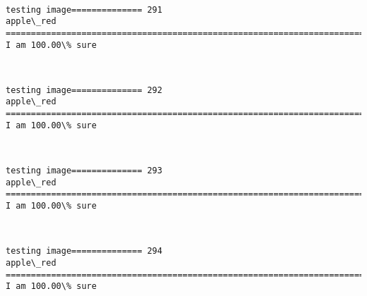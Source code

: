 \documentclass[11pt]{article}
\begin{document}
    \begin{center}
    \end{center}
    { \hspace*{\fill} \\}
    
    \begin{Verbatim}[commandchars=\\\{\}]
testing image============== 291
apple\_red
============================================================================
I am 100.00\% sure

    \end{Verbatim}

    \begin{center}
    \end{center}
    { \hspace*{\fill} \\}
    
    \begin{Verbatim}[commandchars=\\\{\}]
testing image============== 292
apple\_red
============================================================================
I am 100.00\% sure

    \end{Verbatim}

    \begin{center}
    \end{center}
    { \hspace*{\fill} \\}
    
    \begin{Verbatim}[commandchars=\\\{\}]
testing image============== 293
apple\_red
============================================================================
I am 100.00\% sure

    \end{Verbatim}

    \begin{center}
    \end{center}
    { \hspace*{\fill} \\}
    
    \begin{Verbatim}[commandchars=\\\{\}]
testing image============== 294
apple\_red
============================================================================
I am 100.00\% sure

    \end{Verbatim}
\end{document}
